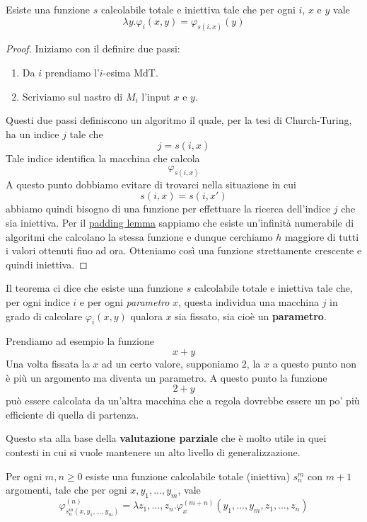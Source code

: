 \begin{theorem}
	\label{th: s-1-1}
	Esiste una funzione $s$ calcolabile totale e iniettiva tale
	che per ogni $i$, $x$ e $y$ vale
	\[ \lambda y . \varphi_i (x, y) = \varphi_{s (i, x)} (y) \]
	\begin{proof}
		Iniziamo con il definire due passi:
		\begin{enumerate}
			\item Da $i$ prendiamo l'$i$-esima MdT.
			\item Scriviamo sul nastro di $M_i$ l'input $x$ e
			      $y$.
		\end{enumerate}
		Questi due passi definiscono un algoritmo il quale, per
		la tesi di Church-Turing, ha un indice $j$ tale che
		\[ j = s(i, x) \]
		Tale indice identifica la macchina che calcola
		\[ \varphi_{s(i,x)} \]
		A questo punto dobbiamo evitare di trovarci nella
		situazione in cui
		\[ s(i, x) = s(i, x') \]
		abbiamo quindi bisogno di una funzione per effettuare la
		ricerca dell'indice $j$ che sia iniettiva. Per il
		\hyperref[th: padding lemma]{padding lemma} sappiamo che
		esiste un'infinità numerabile di algoritmi che calcolano
		la stessa funzione e dunque cerchiamo $h$ maggiore di
		tutti i valori ottenuti fino ad ora. Otteniamo così una
		funzione strettamente crescente e quindi iniettiva.
	\end{proof}
\end{theorem}

Il teorema ci dice che esiste una funzione $s$ calcolabile
totale e iniettiva tale che, per ogni indice $i$ e per ogni
\emph{parametro} $x$, questa individua una macchina $j$ in grado
di calcolare $\varphi_i (x, y)$ qualora $x$ sia fissato, sia
cioè un \textbf{parametro}.

\begin{example}
	Prendiamo ad esempio la funzione
	\[ x + y \]
	Una volta fissata la $x$ ad un certo valore, supponiamo
	$2$, la $x$ a questo punto non è più un argomento ma
	diventa un parametro. A questo punto la funzione
	\[ 2 + y \]
	può essere calcolata da un'altra macchina che a regola
	dovrebbe essere un po' più efficiente di quella di partenza.
\end{example}

Questo sta alla base della \textbf{valutazione parziale} che è
molto utile in quei contesti in cui si vuole mantenere un alto
livello di generalizzazione.

\begin{theorem}
	\label{th: s-m-n}
	Per ogni $m, n \geq 0$ esiste una funzione calcolabile
	totale (iniettiva) $s_n^m$ con $m+1$ argomenti, tale che
	per ogni $x, y_1, \dots, y_m$, vale
	\[
		\varphi_{s_n^m (x, y_1, \dots, y_m)}^{(n)} =
		\lambda z_1, \dots, z_n .
		\varphi_x^{(m+n)} (y_1, \dots, y_m, z_1, \dots, z_n)
	\]
\end{theorem}

